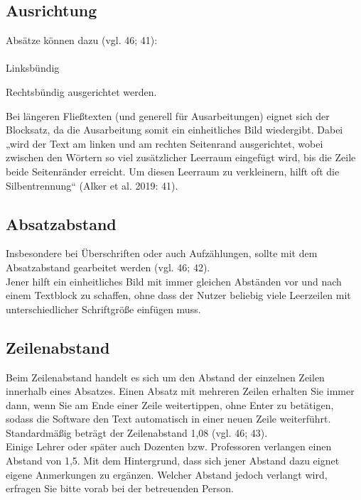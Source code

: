 \documentclass[a4paper, 11pt]{scrartcl}
\begin{document}
	\subsection*{Ausrichtung}
	Absätze können dazu (vgl. 46; 41):\\
	 \\
	Linksbündig \\
	\begin{flushright}
		\vspace{-7mm}
		Rechtsbündig ausgerichtet werden.
	\end{flushright}
	\begin{justify}
		\vspace{-2mm}
		Bei längeren Fließtexten (und generell für Ausarbeitungen) eignet sich der Blocksatz, da die Ausarbeitung somit ein einheitliches Bild wiedergibt. Dabei „wird der Text am linken und am rechten Seitenrand ausgerichtet, wobei zwischen den Wörtern so viel zusätzlicher Leerraum eingefügt wird, bis die Zeile beide Seitenränder erreicht. Um diesen Leerraum zu verkleinern, hilft oft die Silbentrennung“ (Alker et al. 2019: 41).
	\end{justify}
	\subsection*{Absatzabstand}
	\begin{justify}
		Insbesondere bei Überschriften oder auch Aufzählungen, sollte mit dem Absatzabstand gearbeitet werden (vgl. 46; 42). \vspace{2.5mm} \\
		Jener hilft ein einheitliches Bild mit immer gleichen Abständen vor und nach einem Textblock zu schaffen, ohne dass der Nutzer beliebig viele Leerzeilen mit unterschiedlicher Schriftgröße einfügen muss.
	\end{justify}
	\subsection*{Zeilenabstand}
	\begin{justify}
		\setstretch{1.05}
		Beim Zeilenabstand handelt es sich um den Abstand der einzelnen Zeilen innerhalb eines Absatzes. Einen Absatz mit mehreren Zeilen erhalten Sie immer dann, wenn Sie am Ende einer Zeile weitertippen, ohne Enter zu betätigen, sodass die Software den Text automatisch in einer neuen Zeile weiterführt. Standardmäßig beträgt der Zeilenabstand 1,08 (vgl. 46; 43). \vspace{2,5mm} \\
		Einige Lehrer oder später auch Dozenten bzw. Professoren verlangen einen Abstand von 1,5. Mit dem Hintergrund, dass sich jener Abstand dazu eignet eigene Anmerkungen zu ergänzen. Welcher Abstand jedoch verlangt wird, erfragen Sie bitte vorab bei der betreuenden Person.
	\end{justify}
\end{document}
